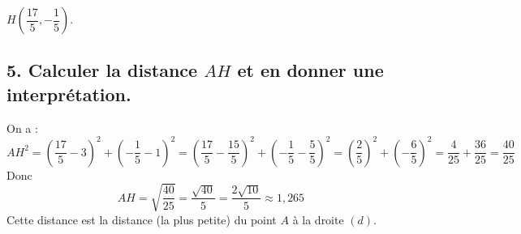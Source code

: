 	$H \left( \dfrac{17}{5}, -\dfrac{1}{5} \right)$.
	
	\subsection*{5. Calculer la distance $AH$ et en donner une interprétation.}
On a :
	\[
	AH^2 = \left( \dfrac{17}{5} - 3 \right)^2 + \left( -\dfrac{1}{5} - 1 \right)^2 = \left( \dfrac{17}{5} - \dfrac{15}{5} \right)^2 + \left( -\dfrac{1}{5} - \dfrac{5}{5} \right)^2 = \left( \dfrac{2}{5} \right)^2 + \left( -\dfrac{6}{5} \right)^2 = \dfrac{4}{25} + \dfrac{36}{25} = \dfrac{40}{25}
	\]
Donc
	\[
	AH = \sqrt{\dfrac{40}{25}} = \dfrac{\sqrt{40}}{5} = \dfrac{2\sqrt{10}}{5} \approx 1,265
	\]
Cette distance est la distance (la plus petite) du point $A$ à la droite $(d)$.

